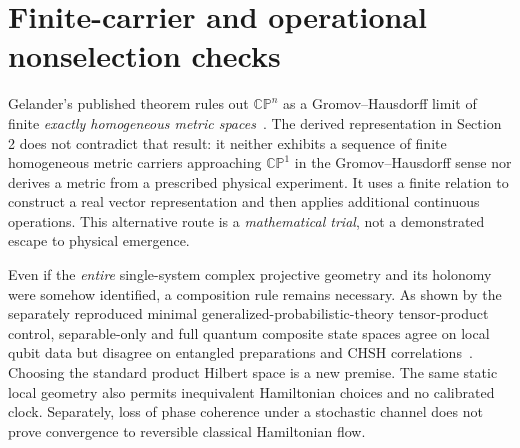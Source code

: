 \documentclass[10pt,letterpaper]{article}
\newcommand{\CP}{\mathbb{CP}}
\begin{document}
\section{Finite-carrier and operational nonselection checks}
Gelander's published theorem rules out $\CP^n$ as a Gromov--Hausdorff limit of finite \emph{exactly homogeneous metric spaces}~\cite{Gelander2013}.  The derived representation in Section 2 does not contradict that result: it neither exhibits a sequence of finite homogeneous metric carriers approaching $\CP^1$ in the Gromov--Hausdorff sense nor derives a metric from a prescribed physical experiment.  It uses a finite relation to construct a real vector representation and then applies additional continuous operations.  This alternative route is a \emph{mathematical trial}, not a demonstrated escape to physical emergence.

Even if the \emph{entire} single-system complex projective geometry and its holonomy were somehow identified, a composition rule remains necessary.  As shown by the separately reproduced minimal generalized-probabilistic-theory tensor-product control, separable-only and full quantum composite state spaces agree on local qubit data but disagree on entangled preparations and CHSH correlations~\cite{Eftaxias2023}.  Choosing the standard product Hilbert space is a new premise.  The same static local geometry also permits inequivalent Hamiltonian choices and no calibrated clock.  Separately, loss of phase coherence under a stochastic channel does not prove convergence to reversible classical Hamiltonian flow.
\end{document}
